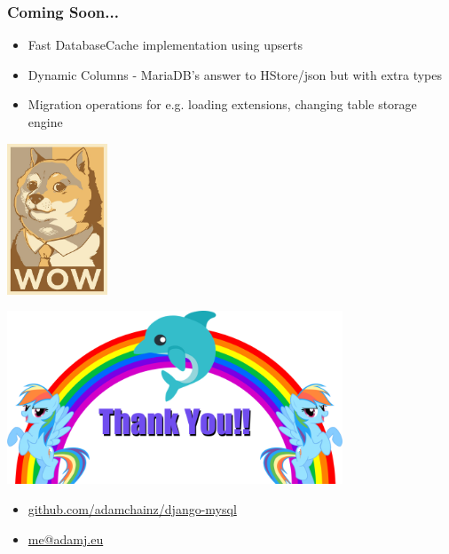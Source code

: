 \documentclass{beamer}
\begin{document}
\begin{frame}[fragile]\frametitle{Coming Soon...}

    \begin{itemize}
        \item Fast DatabaseCache implementation using upserts
        \item Dynamic Columns - MariaDB's answer to HStore/json but with extra
              types
        \item Migration operations for e.g. loading extensions, changing
              table storage engine
    \end{itemize}

    \begin{center}
        \includegraphics[width=3cm]{wow-doge}
    \end{center}

\end{frame}


\begin{frame}[fragile]

    \begin{center}
        \includegraphics[width=10cm]{thank-you}
    \end{center}

    \begin{itemize}
        \item \url{github.com/adamchainz/django-mysql}
        \item \url{me@adamj.eu}
    \end{itemize}

\end{frame}
\end{document}

